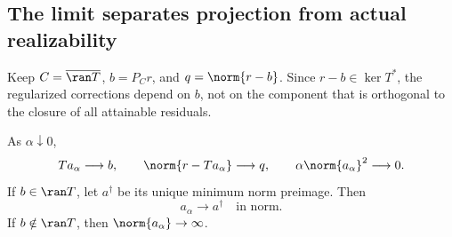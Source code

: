 \subsection{The limit separates projection from actual realizability}
Keep $C=\overline{\ran T}$, $b=P_Cr$, and $q=\norm{r-b}$. Since $r-b\in\ker T^*$, the regularized corrections depend on $b$, not on the component that is orthogonal to the closure of all attainable residuals.

\begin{theorem}\label{WR08}
As $\alpha\downarrow0$,
\[
 Ta_\alpha\longrightarrow b,\qquad
 \norm{r-Ta_\alpha}\longrightarrow q,\qquad
 \alpha\norm{a_\alpha}^2\longrightarrow0.
\]
If $b\in\ran T$, let $a^\dagger$ be its unique minimum norm preimage. Then
\[
 a_\alpha\longrightarrow a^\dagger\quad\text{in norm}.
\]
If $b\notin\ran T$, then $\norm{a_\alpha}\to\infty$.
\end{theorem}
